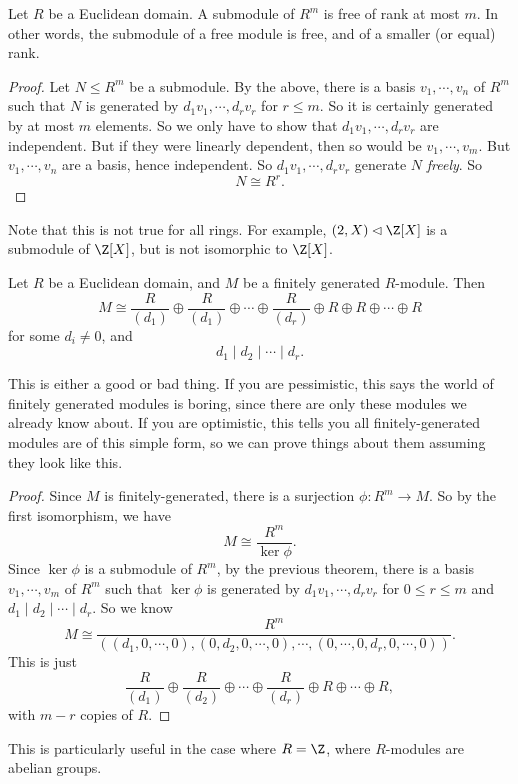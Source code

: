 \documentclass[a4paper]{article}
\begin{document}
\begin{cor}
  Let $R$ be a Euclidean domain. A submodule of $R^m$ is free of rank at most $m$. In other words, the submodule of a free module is free, and of a smaller (or equal) rank.
\end{cor}

\begin{proof}
  Let $N \leq R^m$ be a submodule. By the above, there is a basis $v_1, \cdots, v_n$ of $R^m$ such that $N$ is generated by $d_1 v_1, \cdots, d_r v_r$ for $r \leq m$. So it is certainly generated by at most $m$ elements. So we only have to show that $d_1 v_1, \cdots, d_r v_r$ are independent. But if they were linearly dependent, then so would be $v_1, \cdots, v_m$. But $v_1, \cdots, v_n$ are a basis, hence independent. So $d_1 v_1, \cdots, d_r v_r$ generate $N$ \emph{freely}. So
  \[
    N \cong R^r.
  \]
\end{proof}
Note that this is not true for all rings. For example, $(2, X) \lhd \Z[X]$ is a submodule of $\Z[X]$, but is not isomorphic to $\Z[X]$.

\begin{thm}
  Let $R$ be a Euclidean domain, and $M$ be a finitely generated $R$-module. Then
  \[
    M \cong \frac{R}{(d_1)} \oplus \frac{R}{(d_1)} \oplus \cdots \oplus\frac{R}{(d_r)} \oplus R \oplus R \oplus \cdots \oplus R
  \]
  for some $d_i \not= 0$, and
  \[
    d_1 \mid d_2 \mid \cdots \mid d_r.
  \]
\end{thm}
This is either a good or bad thing. If you are pessimistic, this says the world of finitely generated modules is boring, since there are only these modules we already know about. If you are optimistic, this tells you all finitely-generated modules are of this simple form, so we can prove things about them assuming they look like this.

\begin{proof}
  Since $M$ is finitely-generated, there is a surjection $\phi: R^m \to M$. So by the first isomorphism, we have
  \[
    M \cong \frac{R^m}{\ker \phi}.
  \]
  Since $\ker \phi$ is a submodule of $R^m$, by the previous theorem, there is a basis $v_1, \cdots, v_m$ of $R^m$ such that $\ker \phi$ is generated by $d_1 v_1, \cdots, d_r v_r$ for $0 \leq r \leq m$ and $d_1 \mid d_2 \mid \cdots \mid d_r$. So we know
  \[
    M \cong \frac{R^m}{((d_1, 0, \cdots, 0), (0, d_2, 0, \cdots, 0), \cdots, (0, \cdots, 0, d_r, 0, \cdots, 0))}.
  \]
  This is just
  \[
    \frac{R}{(d_1)} \oplus \frac{R}{(d_2)} \oplus \cdots \oplus \frac{R}{(d_r)} \oplus R \oplus \cdots \oplus R,
  \]
  with $m - r$ copies of $R$.
\end{proof}
This is particularly useful in the case where $R = \Z$, where $R$-modules are abelian groups.
\end{document}
